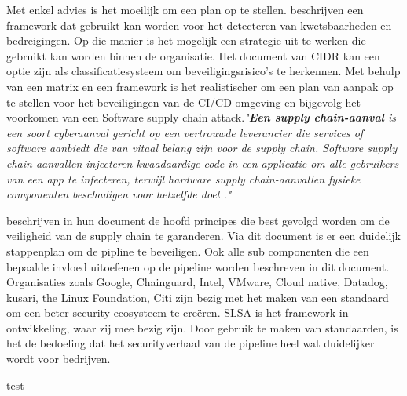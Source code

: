 Met enkel advies is het moeilijk om een plan op te stellen. \autocite{Koopman2019AFF} beschrijven een framework dat gebruikt kan worden voor het detecteren van kwetsbaarheden en bedreigingen. Op die manier is het mogelijk een strategie uit te werken die gebruikt kan worden binnen de organisatie. Het document van CIDR \textcite{Security2022} kan een optie zijn als classificatiesysteem om beveiligingsrisico's te herkennen. Met behulp van een matrix en een framework is het realistischer om een plan van aanpak op te stellen voor het beveiligingen van de CI/CD omgeving en bijgevolg het voorkomen van een Software supply chain attack.\textit{"\textbf{Een supply chain-aanval} is een soort cyberaanval gericht op een vertrouwde leverancier die services of software aanbiedt die van vitaal belang zijn voor de supply chain. Software supply chain aanvallen injecteren kwaadaardige code in een applicatie om alle gebruikers van een app te infecteren, terwijl hardware supply chain-aanvallen fysieke componenten beschadigen voor hetzelfde doel \autocite{Koopman2019AFF}."}
\newline

\textcite{Foundation2021} beschrijven in hun document de hoofd principes die best gevolgd worden om de veiligheid van de supply chain te garanderen. Via dit document is er een duidelijk stappenplan om de pipline te beveiligen. Ook alle sub componenten die een bepaalde invloed uitoefenen op de pipeline worden beschreven in dit document. Organisaties zoals Google, Chainguard, Intel, VMware, Cloud native, Datadog, kusari, the Linux Foundation, Citi zijn bezig met het maken van een standaard om een beter security ecosysteem te creëren. \href{https://slsa.dev}{SLSA} is het framework in ontwikkeling, waar zij mee bezig zijn. Door gebruik te maken van standaarden, is het de bedoeling dat het securityverhaal van de pipeline heel wat duidelijker wordt voor bedrijven. 

test
